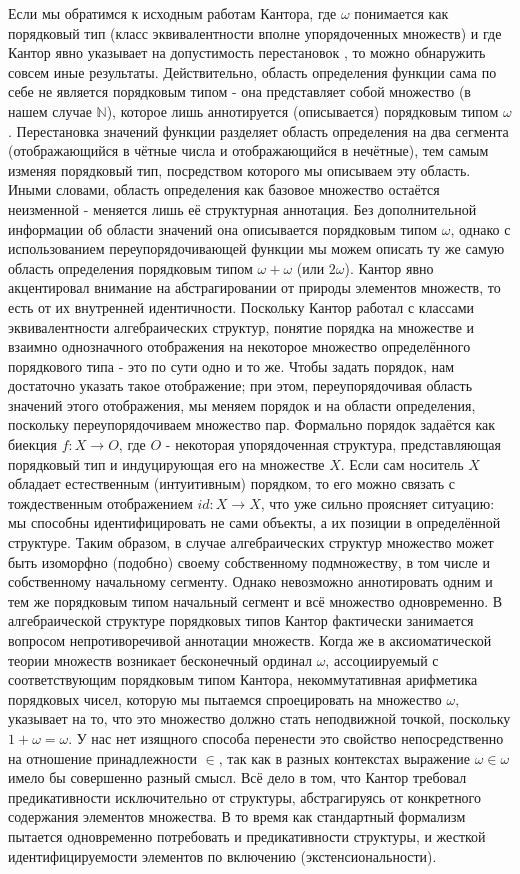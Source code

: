 \documentclass[12pt]{article}
\begin{document}
Если мы обратимся к исходным работам Кантора, где $\omega$ понимается как порядковый тип (класс эквивалентности вполне упорядоченных множеств) и где Кантор явно указывает на допустимость перестановок \cite{cantor-relation}, то можно обнаружить совсем иные результаты. Действительно, область определения функции сама по себе не является порядковым типом - она представляет собой множество (в нашем случае $\mathbb{N}$), которое лишь аннотируется (описывается) порядковым типом $\omega$. Перестановка значений функции разделяет область определения на два сегмента (отображающийся в чётные числа и отображающийся в нечётные), тем самым изменяя порядковый тип, посредством которого мы описываем эту область. Иными словами, область определения как базовое множество остаётся неизменной - меняется лишь её структурная аннотация. Без дополнительной информации об области значений она описывается порядковым типом $\omega$, однако с использованием переупорядочивающей функции мы можем описать ту же самую область определения порядковым типом $\omega + \omega$ (или $2\omega$). Кантор явно акцентировал внимание на абстрагировании от природы элементов множеств, то есть от их внутренней идентичности. Поскольку Кантор работал с классами эквивалентности алгебраических структур, понятие порядка на множестве и взаимно однозначного отображения на некоторое множество определённого порядкового типа - это по сути одно и то же. Чтобы задать порядок, нам достаточно указать такое отображение; при этом, переупорядочивая область значений этого отображения, мы меняем порядок и на области определения, поскольку переупорядочиваем множество пар. Формально порядок задаётся как биекция $f : X \to O$, где $O$ - некоторая упорядоченная структура, представляющая порядковый тип и индуцирующая его на множестве $X$. Если сам носитель $X$ обладает естественным (интуитивным) порядком, то его можно связать с тождественным отображением $id : X \to X$, что уже сильно проясняет ситуацию: мы способны идентифицировать не сами объекты, а их позиции в определённой структуре. Таким образом, в случае алгебраических структур множество может быть изоморфно (подобно) своему собственному подмножеству, в том числе и собственному начальному сегменту. Однако невозможно аннотировать одним и тем же порядковым типом начальный сегмент и всё множество одновременно. В алгебраической структуре порядковых типов Кантор фактически занимается вопросом непротиворечивой аннотации множеств. Когда же в аксиоматической теории множеств возникает бесконечный ординал $\omega$, ассоциируемый с соответствующим порядковым типом Кантора, некоммутативная арифметика порядковых чисел, которую мы пытаемся спроецировать на множество $\omega$, указывает на то, что это множество должно стать неподвижной точкой, поскольку $1 + \omega = \omega$. У нас нет изящного способа перенести это свойство непосредственно на отношение принадлежности $\in$, так как в разных контекстах выражение $\omega \in \omega$ имело бы совершенно разный смысл. Всё дело в том, что Кантор требовал предикативности исключительно от структуры, абстрагируясь от конкретного содержания элементов множества. В то время как стандартный формализм пытается одновременно потребовать и предикативности структуры, и жесткой идентифицируемости элементов по включению (экстенсиональности).
\end{document}
